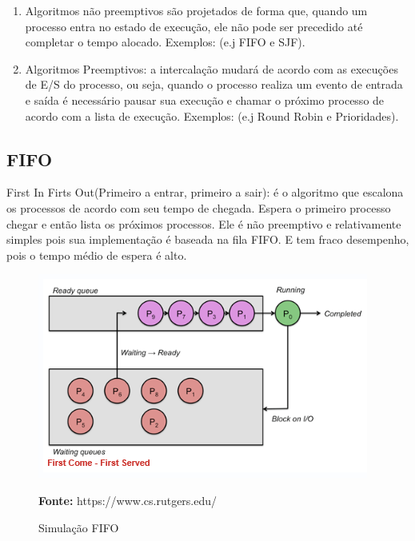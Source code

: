 \documentclass[times, 10pt,twocolumn]{article}
\begin{document}
\begin{enumerate}
\item  Algoritmos não preemptivos são projetados de forma que, quando um processo entra no estado de execução, ele não pode ser precedido até completar o tempo alocado. Exemplos: (e.j FIFO e SJF).
\item Algoritmos Preemptivos: a intercalação mudará de acordo com as execuções de E/S do processo, ou seja, quando o processo realiza um evento de entrada e saída é necessário pausar sua execução e chamar o próximo processo de acordo com a lista de execução. Exemplos: (e.j Round Robin e Prioridades). 
\end{enumerate} 
 
 
\subsection{FIFO} 
First In Firts Out(Primeiro a entrar, primeiro a sair): é o algoritmo que escalona os processos de acordo com seu tempo de chegada. Espera o primeiro processo chegar e então lista os próximos processos. Ele é não preemptivo e relativamente simples pois sua implementação é baseada na fila FIFO. E tem fraco desempenho, pois o tempo médio de espera é alto.\cite{rutgers} 
\begin{figure}[!htb]
	\centering
	\includegraphics[width=.5\textwidth]{figuras/ilusfifo}
	\caption{Simulação FIFO} 
	\textbf{Fonte:} https://www.cs.rutgers.edu/ \cite{rutgers}
	\label{fig:figura-ilus1}
\end{figure}      
 
\end{document}
